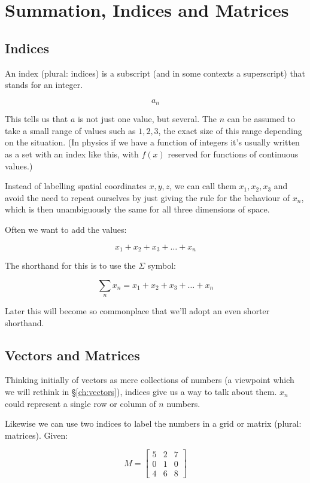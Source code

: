 \chapter{Summation, Indices and Matrices}

\section{Indices}

An index (plural: indices) is a subscript (and in some contexts a superscript) that stands for an integer.

$$a_n$$

This tells us that $a$ is not just one value, but several. The $n$ can be assumed to take a small range of values such as $1, 2, 3$, the exact size of this range depending on the situation. (In physics if we have a function of integers it's usually written as a set with an index like this, with $f(x)$ reserved for functions of continuous values.)

Instead of labelling spatial coordinates $x, y, z$, we can call them $x_1, x_2, x_3$ and avoid the need to repeat ourselves by just giving the rule for the behaviour of $x_n$, which is then unambiguously the same for all three dimensions of space.

Often we want to add the values:

$$x_1 + x_2 + x_3 + \dots + x_n$$

The shorthand for this is to use the $\Sigma$ symbol:

$$\sum_n{x_n} = x_1 + x_2 + x_3 + \dots + x_n$$

Later this will become so commonplace that we'll adopt an even shorter shorthand.


\section{Vectors and Matrices}

Thinking initially of vectors as mere collections of numbers (a viewpoint which we will rethink in §\ref{ch:vectors}), indices give us a way to talk about them. $x_n$ could represent a single row or column of $n$ numbers.

Likewise we can use two indices to label the numbers in a grid or matrix (plural: matrices). Given:

$$
M = \begin{bmatrix}
5 & 2 & 7 \\
0 & 1 & 0 \\
4 & 6 & 8
\end{bmatrix}
$$

